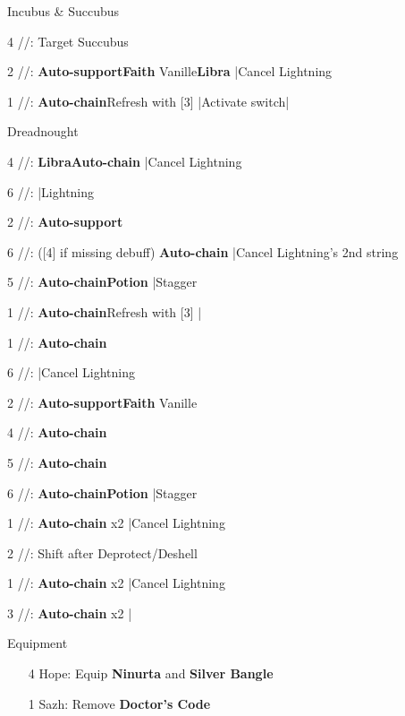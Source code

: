 \begin{fight}{Incubus \& Succubus}
	\item [4] \rav/\rav/\sab: Target Succubus
	\item [2] \syn/\com/\sab: \textbf{Auto-support}\to \textbf{Faith} Vanille\to \textbf{Libra} |Cancel Lightning
	\item [1] \rav/\com/\rav: \textbf{Auto-chain}\to Refresh with [3] |Activate switch|\skip
\end{fight}
\begin{mainlist}
	\item \skip
\end{mainlist}
\begin{fight}{Dreadnought}
	\item [4] \rav/\rav/\sab: \textbf{Libra}\to \textbf{Auto-chain} |Cancel Lightning
	\item [6] \rav/\rav/\rav: |Lightning
	\item [2] \syn/\com/\sab: \textbf{Auto-support}
	\item [6] \rav/\rav/\rav: ([4] if missing debuff) \textbf{Auto-chain} |Cancel Lightning's 2nd string
	\item [5] \rav/\rav/\rav: \textbf{Auto-chain}\to \textbf{\textbf{Potion}} |Stagger
	\item [1] \rav/\com/\rav: \textbf{Auto-chain}\to Refresh with [3] |\skip
	\item [1] \rav/\com/\rav: \textbf{Auto-chain}
	\item [6] \rav/\rav/\rav: |Cancel Lightning
	\item [2] \syn/\com/\sab: \textbf{Auto-support}\to \textbf{Faith} Vanille
	\item [4] \rav/\rav/\sab: \textbf{Auto-chain}
	\item [5] \rav/\rav/\rav: \textbf{Auto-chain}
	\item [6] \rav/\rav/\rav: \textbf{Auto-chain}\to \textbf{\textbf{Potion}} |Stagger
	\item [1] \rav/\com/\rav: \textbf{Auto-chain} x2 |Cancel Lightning
	\item [2] \syn/\com/\sab: Shift after Deprotect/Deshell
	\item [1] \rav/\com/\rav: \textbf{Auto-chain} x2 |Cancel Lightning
	\item [3] \rav/\com/\rav: \textbf{Auto-chain} x2 |\skip
\end{fight}
\begin{menu}
	\item Equipment
	\begin{itemize}
		\item [4] Hope: Equip \textbf{Ninurta} and \textbf{Silver Bangle}
		\item [1] Sazh: Remove \textbf{Doctor's Code}
	\end{itemize}
\end{menu}

